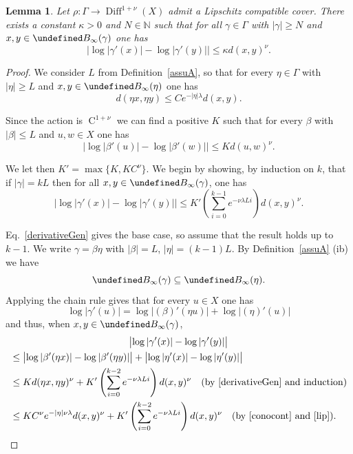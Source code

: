 \documentclass[10pt,a4paper]{article}
\newtheorem{lemm}[prop]{Lemma}
\theoremstyle{definition}
\let\cal\undefined
\DeclareMathOperator{\class}{C}
\DeclareMathOperator{\Diff}{Diff}
\renewcommand{\sf}[1]{{\mathsf{#1}}}
\newcommand{\G}{\sf{\Gamma}}
\newcommand{\cal}{\mathcal}
\newcommand{\N}{\mathbb{N}}
\newcommand{\g}{\gamma}
\renewcommand{\/}{\backslash}
\newcommand{\<}{\langle}
\renewcommand{\>}{\rangle}
\numberwithin{equation}{section}
\begin{document}
\begin{lemm}\label{controlC}
Let $\rho:\G\to\Diff^{1+\nu}(X)$ admit a Lipschitz compatible cover. There exists a constant $\kappa>0$ and $N\in\N$ such that for all $\g\in\G$ with $|\g|\geq N$ and $x,y\in\cal B_\infty(\g)$ one has
\[
\bigl\lvert\log\left|\g'(x)\right|-\log\left|\g'(y)\right|\bigr|\leq \kappa d(x,y)^\nu.
\]
\end{lemm}



\begin{proof}
We consider $L$ from Definition~\ref{assuA}, so that for every $\eta\in\G$ with $|\eta|\geq L$ and $x,y\in\cal B_\infty(\eta)$ one has
\begin{equation}\label{lip}
d(\eta x,\eta y)\leq Ce^{-|\eta|\lambda}d(x,y).
\end{equation}

Since the action is $\class^{1+\nu}$ we can find a positive $K$ such that for every $\beta$ with $|\beta|\leq L$ and $u,w\in X$ one has
\begin{equation}\label{derivativeGen}
\bigl\lvert\log\left|\beta'(u)\right|-\log\left|\beta'(w)\right|\bigr|\leq Kd(u,w)^\nu.
\end{equation}

We let then $K'=\max\{K,KC^\nu\}$. We begin by showing, by induction on $k$, that if $|\g|=kL$ then for all $x,y\in\cal B_\infty(\g)$, one has
\begin{equation}\label{induc}
\bigl\lvert\log\left|\g'(x)\right|-\log\left|\g'(y)\right|\bigr|\leq K'\left(\sum_{i=0}^{k-1}e^{-\nu\lambda L i}\right)d(x,y)^\nu.
\end{equation}

Eq.~\eqref{derivativeGen} gives the base case, so assume that the result holds up to $k-1$. We write $\g=\beta\eta$ with $|\beta|=L$, $|\eta|=(k-1)L$. By Definition~\ref{assuA} (ib) we have
\begin{equation}\label{conocont}
\cal B_\infty(\g)\subseteq\cal B_\infty(\eta).
\end{equation}
Applying the chain rule gives that for every $u\in X$ one has
\[
\log\left|\g'(u)\right|=\log\left|(\beta)'(\eta u)\right|+\log\left|(\eta)'(u)\right|
\]
and thus, when $x,y\in\cal B_\infty(\g)$,
\begin{multline*}
\bigl\lvert\log\left|\g'(x)\right|-\log\left|\g'(y)\right|\bigr\rvert\\
\begin{aligned}
& \leq \bigl\lvert\log\left|\beta'(\eta x)\right|-\log\left|\beta'(\eta y)\right|\bigr\rvert+\bigl|\log\left|\eta'(x)\right| -\log\left|\eta'(y)\right|\bigr|\\
& \leq K d(\eta x,\eta y)^\nu + K'\left(\sum_{i=0}^{k-2}e^{-\nu\lambda L i}\right)d(x,y)^\nu\quad (\text{by~\eqref{derivativeGen} and induction})\\
& \leq KC^\nu e^{-|\eta|\nu\lambda}d(x,y)^\nu+ K'\left(\sum_{i=0}^{k-2}e^{-\nu\lambda L i}\right)d(x,y)^\nu\quad (\text{by~\eqref{conocont} and~\eqref{lip}}).
\end{aligned}
\end{multline*}


\end{proof}
\end{document}
